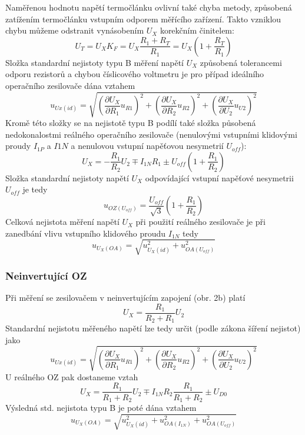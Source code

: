\documentclass{article}
\begin{document}
Naměřenou hodnotu napětí termočlánku ovlivní také chyba metody, způsobená zatížením termočlánku vstupním odporem měřícího zařízení. Takto vzniklou chybu můžeme odstranit vynásobením $U_X$ korekčním činitelem:
\begin{equation}
    U_T = U_X K_F = U_X \frac{R_1+R_T}{R_1} = U_X (1+\frac{R_T}{R_1})
\end{equation}
Složka standardní nejistoty typu B měření napětí $U_X$ způsobená tolerancemi odporu rezistorů a chybou číslicového voltmetru je pro případ ideálního operačního zesilovače dána vztahem
\begin{equation}
    u_{Ux(id)}=\sqrt{(\frac{\partial U_X}{\partial R_1}u_{R1})^2 + (\frac{\partial U_X}{\partial R_2}u_{R2})^2 + (\frac{\partial U_X}{\partial U_2}u_{U2})^2}
\end{equation}
Kromě této složky se na nejistotě typu B podílí také složka působená nedokonalostmi reálného operačního zesilovače (nenulovými vstupními klidovými proudy $I_{1P}$ a $I{1N}$ a nenulovou vstupní napěťovou nesymetrií $U_{off}$):
\begin{equation}
    U_X=-\frac{R_1}{R_2}U_2 \mp I_{1N}R_1\pm U_{off}(1+\frac{R_1}{R_2})
\end{equation}
Složka standardní nejistoty napětí $U_{X}$ odpovídající vstupní napěťové nesymetrii $U_{off}$ je
tedy
\begin{equation}
    u_{OZ(U_{off})} = \frac{U_{off}}{\sqrt{3}}(1+\frac{R_1}{R_2})
\end{equation}
Celková nejistota měření napětí $U_{X}$ při použití reálného zesilovače je při zanedbání vlivu
vstupního klidového proudu $I_{1N}$ tedy
\begin{equation}
    u_{U_X(OA)}=\sqrt{u_{U_X(id)}^2+u_{OA(U_{off})}^2}
\end{equation}

\subsubsection{Neinvertující OZ}
Při měření se zesilovačem v neinvertujícím zapojení (obr. 2b) platí
\begin{equation}
    U_X=\frac{R_1}{R_2+R_1}U_2
\end{equation}
Standardní nejistotu měřeného napětí lze tedy určit (podle zákona šíření nejistot) jako
\begin{equation}
    u_{Ux(id)}=\sqrt{(\frac{\partial U_X}{\partial R_1}u_{R1})^2 + (\frac{\partial U_X}{\partial R_2}u_{R2})^2 + (\frac{\partial U_X}{\partial U_2}u_{U2})^2}
\end{equation}
U reálného OZ pak dostaneme vztah
\begin{equation}
    U_X=\frac{R_1}{R_1+R_2}U_2 \mp I_{1N}R_2\frac{R_1}{R_1+R_2}\pm U_{D0}
\end{equation}
Výsledná std. nejistota typu B je poté dána vztahem
\begin{equation}
    u_{U_X(OA)}=\sqrt{u_{U_X(id)}^2+u_{OA(I_{1N})}^2+u_{OA(U_{off})}^2}
\end{equation}
\end{document}
